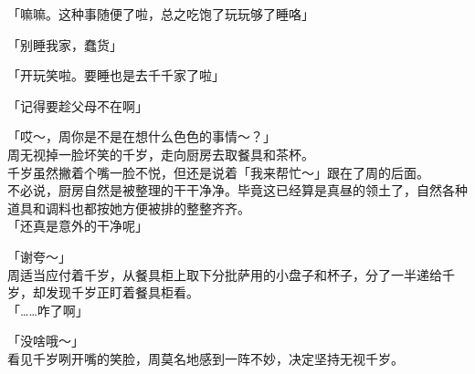 「嘛嘛。这种事随便了啦，总之吃饱了玩玩够了睡咯」

「别睡我家，蠢货」

「开玩笑啦。要睡也是去千千家了啦」

「记得要趁父母不在啊」

「哎～，周你是不是在想什么色色的事情～？」\\

周无视掉一脸坏笑的千岁，走向厨房去取餐具和茶杯。\\

千岁虽然撇着个嘴一脸不悦，但还是说着「我来帮忙～」跟在了周的后面。\\

不必说，厨房自然是被整理的干干净净。毕竟这已经算是真昼的领土了，自然各种道具和调料也都按她方便被排的整整齐齐。\\

「还真是意外的干净呢」

「谢夸～」\\

周适当应付着千岁，从餐具柜上取下分批萨用的小盘子和杯子，分了一半递给千岁，却发现千岁正盯着餐具柜看。\\

「……咋了啊」

「没啥哦～」\\

看见千岁咧开嘴的笑脸，周莫名地感到一阵不妙，决定坚持无视千岁。

